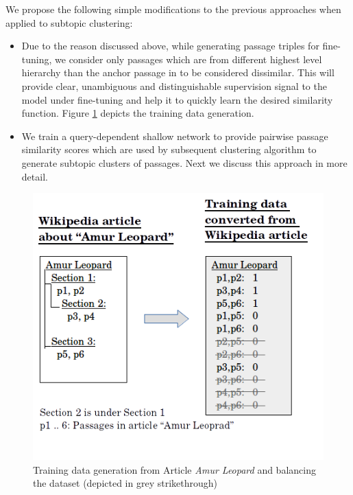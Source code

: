 We propose the following simple modifications to the previous approaches when applied to subtopic clustering:
\begin{itemize}
    \item Due to the reason discussed above, while generating passage triples for fine-tuning, we consider only passages which are from different highest level hierarchy than the anchor passage in to be considered dissimilar. This will provide clear, unambiguous and distinguishable supervision signal to the model under fine-tuning and help it to quickly learn the desired similarity function. Figure \ref{fig:conv} depicts the training data generation.
    \item We train a query-dependent shallow network to provide pairwise passage similarity scores which are used by subsequent clustering algorithm to generate subtopic clusters of passages. Next we discuss this approach in more detail.
\end{itemize}{}
\begin{figure}[h]
  \centering
  \includegraphics[width=\linewidth]{graphics/car_y1_conv.png}
  \caption{Training data generation from Article \textit{Amur Leopard} and balancing the dataset (depicted in grey strikethrough)}
  \label{fig:conv}
\end{figure}

